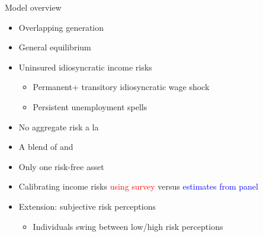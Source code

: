 \documentclass{beamer}
\begin{document}
\begin{frame}{Model overview}
	\begin{itemize}
		\item Overlapping generation 
		\item General equilibrium 

		\item Uninsured idiosyncratic income risks
		\begin{itemize}
		\item Permanent+ transitory idiosyncratic wage shock
		\item Persistent unemployment spells
		\end{itemize}
	\item No aggregate risk a la \cite{krusell1998income} 
		\item A blend of \cite{huggett1996wealth} and \cite{carroll1997buffer}
		\item Only one risk-free asset 
	\item Calibrating income risks \textcolor{red}{using survey} versus \textcolor{blue}{estimates from panel} 
	\item Extension: subjective risk perceptions 
	\begin{itemize}
		\item Individuals swing between low/high risk perceptions
	\end{itemize}

	\end{itemize}
\end{frame}
\end{document}
